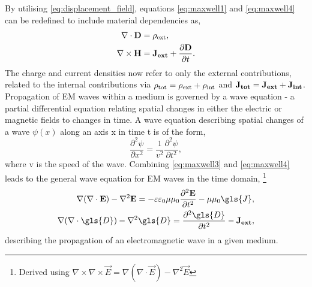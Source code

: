 \documentclass{article}
\begin{document}
By utilising \eqref{eq:displacement_field}, equations \eqref{eq:maxwell1} and \eqref{eq:maxwell4} can be redefined to include material dependencies as,
\begin{subequations}
\begin{align}
\nabla \cdot \mathbf{D} &= \rho_{\mathrm{ext}}, \label{eq:new_maxwell1}\\
\nabla \times \mathbf{H} &= \mathbf{J_{ext}} + \frac{\partial \mathbf{D}}{\partial t}. \label{eq:new_maxwell4}
\end{align}
\end{subequations}
The charge and current densities now refer to only the external contributions, related to the internal contributions via $\rho_{\mathrm{tot}}=\rho_{\mathrm{ext}}+\rho_{\mathrm{int}}$ and $\mathbf{J_{tot}}=\mathbf{J_{ext}}+\mathbf{J_{int}}$.
Propagation of EM waves within a medium is governed by a wave equation {\color{red}- a partial differential equation relating spatial changes in either the electric or magnetic fields to changes in time}. A wave equation describing spatial changes of a wave $\psi(x)$ along an axis \gls{x} in time \gls{t} is of the form,
\begin{equation}
\frac{\partial^2 \psi}{\partial x^2} = \frac{1}{v^2} \frac{\partial^2 \psi}{\partial t^2},
\label{eq:form_wave_equation}
\end{equation}
where \gls{v} is the speed of the wave.
Combining \eqref{eq:maxwell3} and \eqref{eq:maxwell4} leads to the general wave equation for EM waves in the time domain,%
\footnote{Derived using $\nabla \times \nabla \times \vec{E} = \nabla(\nabla\cdot\vec{E}) - \nabla^2\vec{E}$}%
\begin{align}
\nabla(\nabla\cdot\vec{E}) - \nabla^2\vec{E} = -\eps\epsfs\mu\mu_0\frac{\partial^2\vec{E}}{\partial t^2} - \mu\mu_0\gls{J}, \\
\nabla(\nabla\cdot\gls{D}) - \nabla^2\gls{D} = \frac{\partial^2\gls{D}}{\partial t^2} - \Jext,
\label{eq:wave_equation}
\end{align}
describing the propagation of an electromagnetic wave in a given medium.
\end{document}
